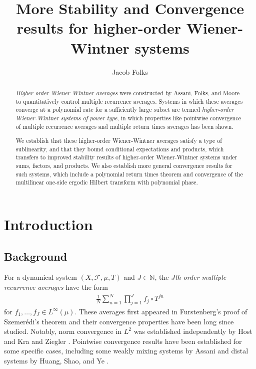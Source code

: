\documentclass[11pt, oneside]{amsart}   	%
\title{More Stability and Convergence results for higher-order Wiener-Wintner systems}
\author{Jacob Folks}							%
\newcommand{\1}{\mathbbm{1}}
\newcommand{\N}{\mathbb{N}}
\theoremstyle{definition}
\begin{document}

\begin{abstract}
    \textit{Higher-order Wiener-Wintner averages} were constructed by Assani, Folks, and Moore \cite{assani2024higherorderwienerwintnersystems} to quantitatively control multiple recurrence averages. Systems in which these averages converge at a polynomial rate for a sufficiently large subset are termed \textit{higher-order Wiener-Wintner systems of power type}, in which properties like pointwise convergence of multiple recurrence averages and multiple return times averages has been shown. 

    We establish that these higher-order Wiener-Wintner averages satisfy a type of sublinearity, and that they bound conditional expectations and products, which transfers to improved stability results of higher-order Wiener-Wintner systems under sums, factors, and products. We also establish more general convergence results for such systems, which include a polynomial return times theorem and convergence of the multilinear one-side ergodic Hilbert transform with polynomial phase.
\end{abstract}
\maketitle

\section{Introduction}

\subsection{Background}
For a dynamical system $(X, \mathcal{F}, \mu, T)$ and $J\in \N$, the \textit{$J$th order multiple recurrence averages} have the form
\begin{align}\label{F:mult rec}
\frac{1}{N} \sum_{n=1}^N \prod_{j=1}^J f_j \circ T^{jn}
\end{align}
for $f_1, \dots, f_J \in L^\infty(\mu)$. These averages first appeared in Furstenberg's proof of Szemerédi's theorem \cite{Fur77} and their convergence properties have been long since studied. Notably, norm convergence in $L^2$ was established independently by Host and Kra \cite{hostkra} and Ziegler \cite{ziegler07}. Pointwise convergence results have been established for some specific cases, including some weakly mixing systems by Assani \cite{assani98} and distal systems by Huang, Shao, and Ye \cite{Ye}. 
\end{document}
